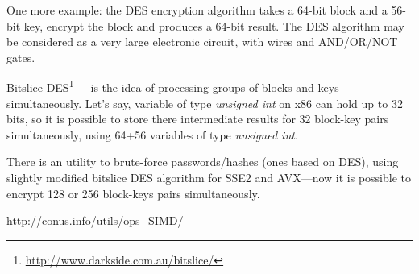 
One more example: the DES encryption algorithm takes a 64-bit block and a 56-bit key, encrypt the block and produces a 64-bit result.
The DES algorithm may be considered as a very large electronic circuit, with wires and AND/OR/NOT gates.

\label{bitslicedes}
\newcommand{\URLBS}{\url{http://www.darkside.com.au/bitslice/}}

Bitslice DES\footnote{\URLBS}~---is the idea of processing groups of blocks and keys simultaneously.
Let's say, variable of type \emph{unsigned int} on x86 can hold up to 32 bits, so it is possible to store there
intermediate results for 32 block-key pairs simultaneously, using 64+56 variables of type \emph{unsigned int}.

\myindex{\oracle}
There is an utility to brute-force \oracle passwords/hashes (ones based on DES),
using slightly modified bitslice DES algorithm for SSE2 and AVX---now it is possible to encrypt 128 
or 256 block-keys pairs simultaneously.

\url{http://conus.info/utils/ops_SIMD/}




